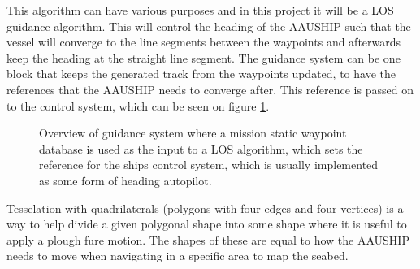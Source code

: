 This algorithm can have various purposes and in this project it will be a \ac{LOS} guidance algorithm. This will control the heading of the AAUSHIP such that the vessel will converge to the line segments between the waypoints and afterwards keep the heading at the straight line segment. The guidance system can be one block that keeps the generated track from the waypoints updated, to have the references that the AAUSHIP needs to converge after. This reference is passed on to the control system, which can be seen on figure \ref{fig:losguide}.
\begin{figure}[htbp]
	\centering
	
	\caption{Overview of guidance system where a mission static waypoint
	database is used as the input to a \ac{LOS} algorithm, which sets
the reference for the ships control system, which is usually
implemented as some form of heading autopilot.}
	\label{fig:losguide}
\end{figure}

Tesselation with quadrilaterals (polygons with four edges and four vertices) is a way to help divide a given polygonal shape into some shape where it is useful to apply a plough fure motion. The shapes of these are equal to how the AAUSHIP needs to move when navigating in a specific area to map the seabed.